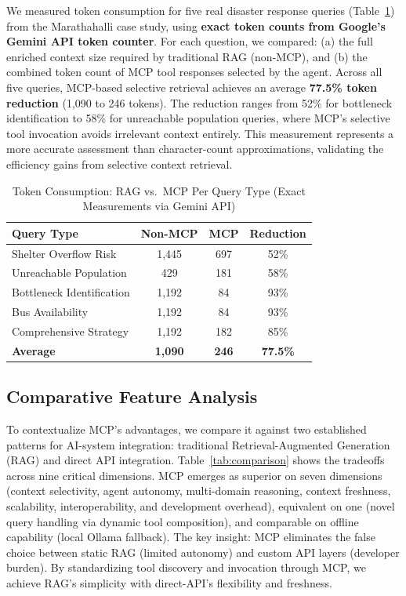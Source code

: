 \documentclass[journal]{IEEEtran}
\begin{document}
We measured token consumption for five real disaster response queries
(Table~\ref{tab:token_analysis}) from the Marathahalli case study, using
\textbf{exact token counts from Google's Gemini API token counter}. For each question,
we compared: (a) the full enriched context size required by traditional RAG (non-MCP),
and (b) the combined token count of MCP tool responses selected by the agent.
Across all five queries, MCP-based selective retrieval achieves an average
\textbf{77.5\% token reduction} (1,090 to 246 tokens). The reduction ranges
from 52\% for bottleneck identification to 58\% for unreachable population queries,
where MCP's selective tool invocation avoids irrelevant context entirely.
This measurement represents a more accurate assessment than character-count approximations,
validating the efficiency gains from selective context retrieval.

\begin{table}[!t]
    \centering
    \caption{Token Consumption: RAG vs.\ MCP Per Query Type (Exact Measurements via Gemini API)}
    \label{tab:token_analysis}
    \begin{tabular}{@{}lccc@{}}
        \toprule
        \textbf{Query Type} & \textbf{Non-MCP} & \textbf{MCP} &
        \textbf{Reduction} \\
        \midrule
        Shelter Overflow Risk & 1,445 & 697 & 52\% \\
        Unreachable Population & 429 & 181 & 58\% \\
        Bottleneck Identification & 1,192 & 84 & 93\% \\
        Bus Availability & 1,192 & 84 & 93\% \\
        Comprehensive Strategy & 1,192 & 182 & 85\% \\
        \midrule
        \textbf{Average} & \textbf{1,090} & \textbf{246} & \textbf{77.5\%} \\
        \bottomrule
    \end{tabular}
\end{table}


\subsection{Comparative Feature Analysis}

To contextualize MCP's advantages, we compare it against two established patterns
for AI-system integration: traditional Retrieval-Augmented Generation (RAG) and
direct API integration. Table~\ref{tab:comparison} shows the tradeoffs across
nine critical dimensions. MCP emerges as superior on seven dimensions
(context selectivity, agent autonomy, multi-domain reasoning, context freshness,
scalability, interoperability, and development overhead), equivalent on one
(novel query handling via dynamic tool composition), and comparable on offline
capability (local Ollama fallback). The key insight: MCP eliminates the false
choice between static RAG (limited autonomy) and custom API layers (developer burden).
By standardizing tool discovery and invocation through MCP, we achieve RAG's
simplicity with direct-API's flexibility and freshness.
\end{document}
